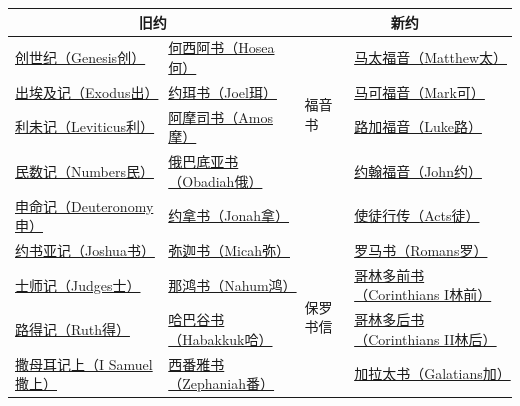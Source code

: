 \documentclass[12pt, a4paper, oneside]{ctexart}
\begin{document}
	\begin{table}[ht]
		\centering
		\tiny
		\begin{tabular}{|l l  | l |l | }
			\hline
			\multicolumn{2}{|c|}{旧约} & \multicolumn{2}{|c|}{新约} \\
			\hline
			\href{https://biblehub.com/bibles/genesis}{创世纪（Genesis创）}  &  \href{https://biblehub.com/bibles/hosea}{何西阿书（Hosea何）}   &\multirow{4}{*}{福音书} & \href{https://biblehub.com/bibles/matthew}{马太福音（Matthew太）}    \\
			\href{https://biblehub.com/bibles/exodus}{出埃及记（Exodus出）}  &  \href{https://biblehub.com/bibles/joel}{约珥书（Joel珥）}     &          & \href{https://biblehub.com/bibles/mark}{马可福音（Mark可）}           \\
			\href{https://biblehub.com/bibles/leviticus}{利未记（Leviticus利）}    &  \href{https://biblehub.com/bibles/amos}{阿摩司书（Amos摩）}    &        & \href{https://biblehub.com/bibles/luke}{路加福音（Luke路）}                      \\
			\href{https://biblehub.com/bibles/numbers}{民数记（Numbers民）}         & \href{https://biblehub.com/bibles/obadiah}{俄巴底亚书（Obadiah俄）}  &      & \href{https://biblehub.com/bibles/john}{约翰福音（John约）}          \\
			\cline{3-4}
			\href{https://biblehub.com/bibles/deuteronomy}{申命记（Deuteronomy申）}     & \href{https://biblehub.com/bibles/jonah}{约拿书（Jonah拿）}    &           & \href{https://biblehub.com/bibles/acts}{使徒行传（Acts徒）}          \\
			\cline{3-4}
			\href{https://biblehub.com/bibles/joshua}{约书亚记（Joshua书）}        & \href{https://biblehub.com/bibles/micah}{弥迦书（Micah弥）}    & \multirow{13}{*}{保罗书信} & \href{https://biblehub.com/bibles/romans}{罗马书（Romans罗）} \\
			\href{https://biblehub.com/bibles/judges}{士师记（Judges士）}          & \href{https://biblehub.com/bibles/nahum}{那鸿书（Nahum鸿）}   &           & \href{https://biblehub.com/bibles/1_corinthians}{哥林多前书（Corinthians I林前）}   \\
			\href{https://biblehub.com/bibles/ruth}{路得记（Ruth得）}            & \href{https://biblehub.com/bibles/habakkuk}{哈巴谷书（Habakkuk哈）}  &          & \href{https://biblehub.com/bibles/2_corinthians}{哥林多后书（Corinthians II林后）}     \\
			\href{https://biblehub.com/bibles/1_samuel}{撒母耳记上（I Samuel撒上）}     & \href{https://biblehub.com/bibles/zephaniah}{西番雅书（Zephaniah番）}  &         & \href{https://biblehub.com/bibles/galatians}{加拉太书（Galatians加）}           \\

\end{tabular}
\end{table}
\end{document}
